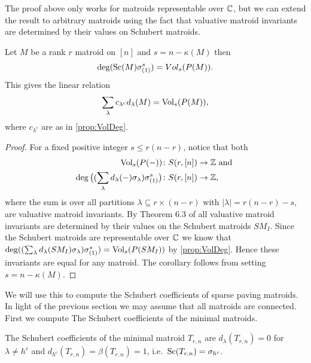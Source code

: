 The proof above only works for matroids representable over ${\mathbb C}$, but we can extend the result to arbitrary matroids using the fact that valuative matroid invariants are determined by their values on Schubert matroids.
\begin{corollary}
    Let $M$ be a rank $r$ matroid on $[n]$ and $s = n - \kappa(M)$ then 
    \begin{equation*}
        \deg(\operatorname{\mathrm{Sc}}(M)\sigma_{(1)}^s) = Vol_s(P(M)).
    \end{equation*}
    This gives the linear relation 
    \begin{equation*}
        \sum_\lambda c_{\lambda^c} d_\lambda(M) = \operatorname{\mathrm{Vol}}_s(P(M)),
    \end{equation*}
    where $c_{\lambda^c}$ are as in \cref{prop:VolDeg}.
\end{corollary}
\begin{proof}
    For a fixed positive integer $s \leq r(n-r)$, notice that both 
    \begin{align*}
        \operatorname{\mathrm{Vol}}_s(P(-)) \colon & S(r,[n]) \to {\mathbb Z} \text{ and }\\
        \deg \big((\sum_\lambda d_\lambda(-) \sigma_\lambda )\sigma_{(1)}^s \big) \colon & S(r,[n]) \to {\mathbb Z},
    \end{align*}
    where the sum is over all partitions $\lambda \subseteq r\times(n-r)$ with $|\lambda| = r(n-r)-s$, are valuative matroid invariants. By Theorem 6.3 of \cite{DerksenFink} all valuative matroid invariants are determined by their values on the Schubert matroids $SM_I$. Since the Schubert matroids are representable over ${\mathbb C}$ we know that $\deg((\sum_\lambda d_\lambda(SM_I) \sigma_\lambda )\sigma_{(1)}^s) = \operatorname{\mathrm{Vol}}_s(P(SM_I))$ by \cref{prop:VolDeg}. Hence these invariants are equal for any matroid. The corollary follows from setting $s = n-\kappa(M)$.
\end{proof}

We will use this to compute the Schubert coefficients of sparse paving matroids. In light of the previous section we may assume that all matroids are connected. First we compute The Schubert coefficients of the minimal matroids.
\begin{lemma}
    \label{lem:minimalMatroid}
    The Schubert coefficients of the minimal matroid $T_{r,n}$ are
    $d_\lambda(T_{r,n}) = 0$ for $\lambda \neq h^c$ and $d_{h^c}(T_{r,n}) = \beta(T_{r,n}) = 1$, i.e.\ $\operatorname{\mathrm{Sc}}(T_{r,n}) = \sigma_{h^c}$.
\end{lemma}

